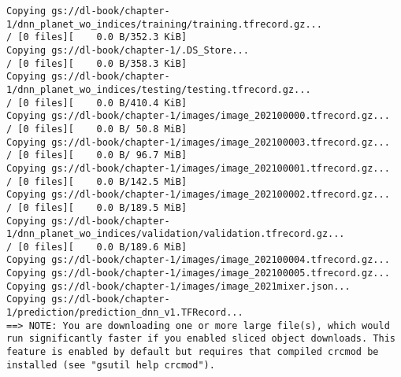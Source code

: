 \documentclass[
  letterpaper,
  DIV=11,
  numbers=noendperiod]{scrreprt}
\begin{document}
\begin{verbatim}
Copying gs://dl-book/chapter-1/dnn_planet_wo_indices/training/training.tfrecord.gz...
/ [0 files][    0.0 B/352.3 KiB]                                                Copying gs://dl-book/chapter-1/.DS_Store...
/ [0 files][    0.0 B/358.3 KiB]                                                Copying gs://dl-book/chapter-1/dnn_planet_wo_indices/testing/testing.tfrecord.gz...
/ [0 files][    0.0 B/410.4 KiB]                                                Copying gs://dl-book/chapter-1/images/image_202100000.tfrecord.gz...
/ [0 files][    0.0 B/ 50.8 MiB]                                                Copying gs://dl-book/chapter-1/images/image_202100003.tfrecord.gz...
/ [0 files][    0.0 B/ 96.7 MiB]                                                Copying gs://dl-book/chapter-1/images/image_202100001.tfrecord.gz...
/ [0 files][    0.0 B/142.5 MiB]                                                Copying gs://dl-book/chapter-1/images/image_202100002.tfrecord.gz...
/ [0 files][    0.0 B/189.5 MiB]                                                Copying gs://dl-book/chapter-1/dnn_planet_wo_indices/validation/validation.tfrecord.gz...
/ [0 files][    0.0 B/189.6 MiB]                                                Copying gs://dl-book/chapter-1/images/image_202100004.tfrecord.gz...
Copying gs://dl-book/chapter-1/images/image_202100005.tfrecord.gz...
Copying gs://dl-book/chapter-1/images/image_2021mixer.json...
Copying gs://dl-book/chapter-1/prediction/prediction_dnn_v1.TFRecord...
==> NOTE: You are downloading one or more large file(s), which would
run significantly faster if you enabled sliced object downloads. This
feature is enabled by default but requires that compiled crcmod be
installed (see "gsutil help crcmod").


\end{verbatim}
\end{document}
